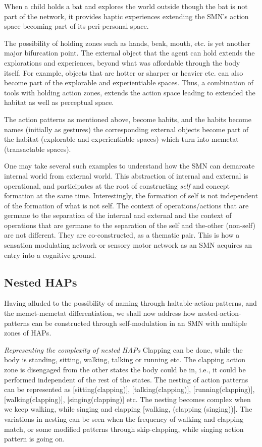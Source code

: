 When a child holds a bat and explores the world outside though the bat is not part of the network, it provides haptic experiences extending the SMN's action space becoming part of its peri-personal space. 

The possibility of holding zones such as hands, beak, mouth, etc. is yet another major bifurcation point. The external object that the agent can hold extends the explorations and experiences, beyond what was affordable through the body itself. For example, objects that are hotter or sharper or heavier etc. can also become part of the explorable and experientiable spaces. Thus, a combination of tools with holding action zones, extends the action space leading to extended the habitat as well as perceptual space. 

The action patterns as mentioned above, become habits, and the habits become names (initially as gestures) the corresponding external objects become part of the habitat (explorable and experientiable spaces) which turn into memetat (transactable spaces). 

One may take several such examples to understand how the SMN can demarcate internal world from external world. This abstraction of internal and external is operational, and participates at the root of constructing \textit{self} and concept formation at the same time. Interestingly, the formation of self is not independent of the formation of what is not self. The context of operations/actions that are germane to the separation of the internal and external and the context of operations that are germane to the separation of the self and the-other (non-self) are not different. They are co-constructed, as a thematic pair. This is how a sensation modulating network or sensory motor network as an SMN acquires an entry into a cognitive ground. 

\subsection{Nested HAPs}

Having alluded to the possibility of naming through haltable-action-patterns, and the memet-memetat differentiation, we shall now address how nested-action-patterns can be constructed through self-modulation in an SMN with multiple zones of HAPs. 

\emph{Representing the complexity of nested HAPs} Clapping can be done, while the body is standing, sitting, walking, talking or running etc. The clapping action zone is disengaged from the other states the body could be in, i.e., it could be performed independent of the rest of the states. The nesting of action patterns can be represented as [sitting(clapping)],  [talking(clapping)],  [running(clapping)],  [walking(clapping)],  [singing(clapping)] etc. The nesting becomes complex when we keep walking, while singing and clapping [walking, (clapping (singing))]. The variations in nesting can be seen when the frequency of walking and clapping match, or some modified patterns through skip-clapping, while singing action pattern is going on. 

